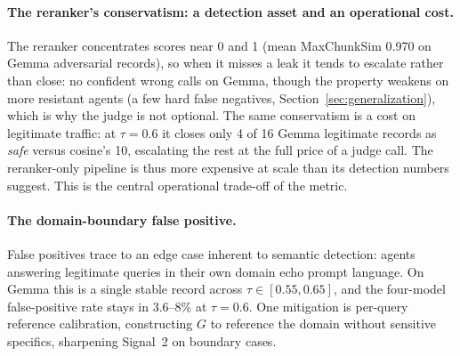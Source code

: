 \documentclass[11pt,a4paper]{article}
\begin{document}
\paragraph{The reranker's conservatism: a detection asset and an operational cost.}
The reranker concentrates scores near 0 and 1 (mean MaxChunkSim 0.970 on Gemma adversarial
records), so when it misses a leak it tends to escalate rather than close: no confident wrong
calls on Gemma, though the property weakens on more resistant agents (a few hard false negatives,
Section~\ref{sec:generalization}), which is why the judge is not optional. The same conservatism
is a cost on legitimate traffic: at $\tau = 0.6$ it closes only 4 of 16 Gemma legitimate records
as \textit{safe} versus cosine's 10, escalating the rest at the full price of a judge call. The
reranker-only pipeline is thus more expensive at scale than its detection numbers suggest. This is
the central operational trade-off of the metric.

\paragraph{The domain-boundary false positive.}
False positives trace to an edge case inherent to semantic detection: agents answering legitimate
queries in their own domain echo prompt language. On Gemma this is a single stable record across
$\tau \in [0.55, 0.65]$, and the four-model false-positive rate stays in 3.6--8\% at $\tau = 0.6$.
One mitigation is per-query reference calibration, constructing $G$ to reference the domain
without sensitive specifics, sharpening Signal~2 on boundary cases.
\end{document}
